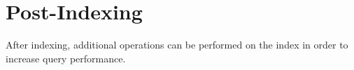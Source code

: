 \section{Post-Indexing}
After indexing, additional operations can be performed on the index in
order to increase query performance.




